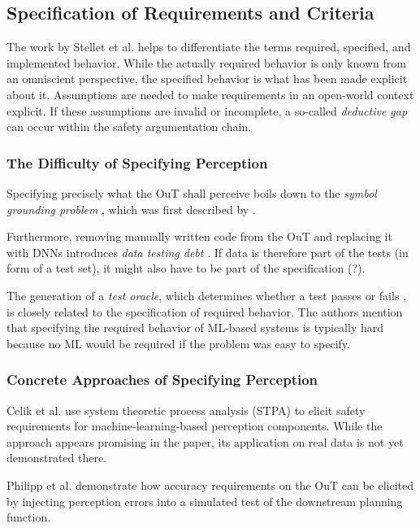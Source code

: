 \documentclass[conference]{IEEEtran}
\newcommand{\citeold}[1]{{\hypersetup{citecolor=black}\cite{#1}}}
\begin{document}
\subsection{Specification of Requirements and Criteria}
\label{sec:requirements}

The work by Stellet et al. \cite{Stellet2019formalization} helps to differentiate the terms required, specified, and implemented behavior.
While the actually required behavior is only known from an omniscient perspective, the specified behavior is what has been made explicit about it. 
Assumptions are needed to make requirements in an open-world context explicit. 
If these assumptions are invalid or incomplete, a so-called \textit{deductive gap} can occur within the safety argumentation chain. 


\subsubsection{The Difficulty of Specifying Perception}

Specifying precisely what the OuT shall perceive boils down to the \textit{symbol grounding problem} \citeold{Salay2019partialspecifications}, which was first described by \cite{Harnad1990symbolgrounding}.

Furthermore, removing manually written code from the OuT and replacing it with DNNs introduces \textit{data testing debt} \cite{Sculley2015debt}. 
If data is therefore part of the tests (in form of a test set), it might also have to be part of the specification (?).

The generation of a \textit{test oracle}, which determines whether a test passes or fails \cite{Abrecht2021testing}, is closely related to the specification of required behavior. 
The authors mention that specifying the required behavior of ML-based systems is typically hard because no ML would be required if the problem was easy to specify.


\subsubsection{Concrete Approaches of Specifying Perception} 

Celik et al. \cite{Celik2022stpa} use system theoretic process analysis (STPA) to elicit safety requirements for machine-learning-based perception components. While the approach appears promising in the paper, its application on real data is not yet demonstrated there. 

Philipp et al. \cite{Philipp2021requirements} demonstrate how accuracy requirements on the OuT can be elicited by injecting perception errors into a simulated test of the downstream planning function. 
\end{document}
